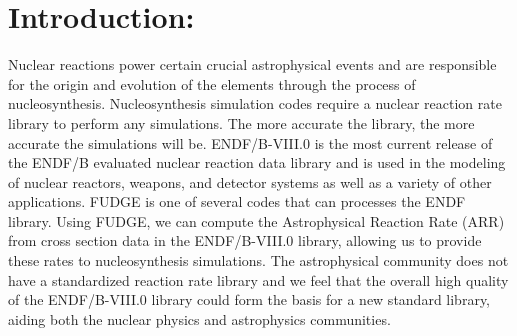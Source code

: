 \documentclass{article}
\begin{document}
\section{Introduction:}
Nuclear reactions power certain crucial astrophysical events and are responsible for the origin and evolution of the elements through the process of nucleosynthesis. Nucleosynthesis simulation codes require a nuclear reaction rate library to perform any simulations. The more accurate the library, the more accurate the simulations will be. ENDF/B-VIII.0 is the most current release of the ENDF/B evaluated nuclear reaction data library and is used in the modeling of nuclear reactors, weapons, and detector systems as well as a variety of other applications. FUDGE is one of several codes that can processes the ENDF library. Using FUDGE, we can compute the Astrophysical Reaction Rate (ARR) from cross section data in the ENDF/B-VIII.0 library, allowing us to provide these rates to nucleosynthesis simulations. The astrophysical community does not have a standardized reaction rate library and we feel that the overall high quality of the ENDF/B-VIII.0 library could form the basis for a new standard library, aiding both the nuclear physics and astrophysics communities.  \cite{ENDF}
\end{document}
